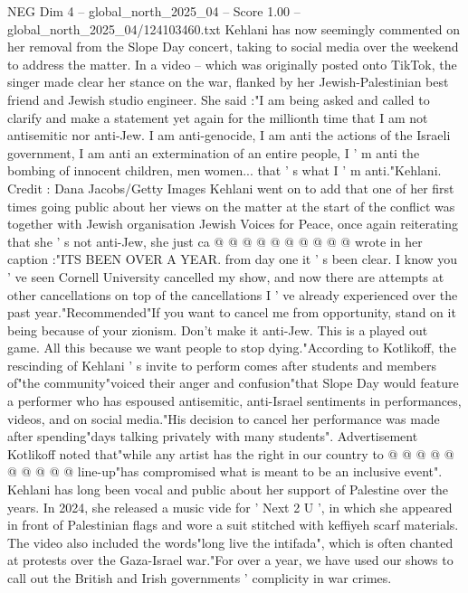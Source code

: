 \begin{textsample}{NEG Dim 4 – global\_north\_2025\_04 – Score 1.00 – global\_north\_2025\_04/124103460.txt}  \label{ex:f4_neg_239}
Kehlani has now seemingly commented on her removal from the Slope Day concert, taking to social media over the weekend to address the matter.
In a video -- which was originally posted onto TikTok, the singer made clear her stance on the war, flanked by her Jewish-Palestinian best friend and Jewish studio engineer.
She said :"I am being asked and called to clarify and make a statement yet again for the millionth time that I am not antisemitic nor anti-Jew.
I am anti-genocide, I am anti the actions of the Israeli government, I am anti an extermination of an entire people, I ' m anti the bombing of innocent children, men women... that ' s what I ' m anti."Kehlani.
Credit : Dana Jacobs/Getty Images Kehlani went on to add that one of her first times going public about her views on the matter at the start of the conflict was together with Jewish organisation Jewish Voices for Peace, once again reiterating that she ' s not anti-Jew, she just ca @ @ @ @ @ @ @ @ @ @ wrote in her caption :"ITS BEEN OVER A YEAR. from day one it ' s been clear.
I know you ' ve seen Cornell University cancelled my show, and now there are attempts at other cancellations on top of the cancellations I ' ve already experienced over the past year."Recommended"If you want to cancel me from opportunity, stand on it being because of your zionism.
Don't make it anti-Jew.
This is a played out game.
All this because we want people to stop dying."According to Kotlikoff, the rescinding of Kehlani ' s invite to perform comes after students and members of"the community"voiced their anger and confusion"that Slope Day would feature a performer who has espoused antisemitic, anti-Israel sentiments in performances, videos, and on social media."His decision to cancel her performance was made after spending"days talking privately with many students".
Advertisement Kotlikoff noted that"while any artist has the right in our country to @ @ @ @ @ @ @ @ @ @ line-up"has compromised what is meant to be an inclusive event".
Kehlani has long been vocal and public about her support of Palestine over the years.
In 2024, she released a music vide for ' Next 2 U ', in which she appeared in front of Palestinian flags and wore a suit stitched with keffiyeh scarf materials.
The video also included the words"long live the intifada", which is often chanted at protests over the Gaza-Israel war."For over a year, we have used our shows to call out the British and Irish governments ' complicity in war crimes.

\end{textsample}
